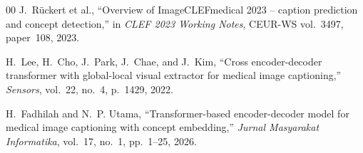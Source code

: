\documentclass[conference]{IEEEtran}
\begin{document}
\begin{thebibliography}{00}
J.~Rückert et al., ``Overview of ImageCLEFmedical 2023 -- caption prediction and concept detection,'' in \emph{CLEF 2023 Working Notes}, CEUR-WS vol.~3497, paper~108, 2023.

H.~Lee, H.~Cho, J.~Park, J.~Chae, and J.~Kim, ``Cross encoder-decoder transformer with global-local visual extractor for medical image captioning,'' \emph{Sensors}, vol.~22, no.~4, p.~1429, 2022.

H.~Fadhilah and N.~P. Utama, ``Transformer-based encoder-decoder model for medical image captioning with concept embedding,'' \emph{Jurnal Masyarakat Informatika}, vol.~17, no.~1, pp.~1--25, 2026.

\end{thebibliography}
\end{document}

